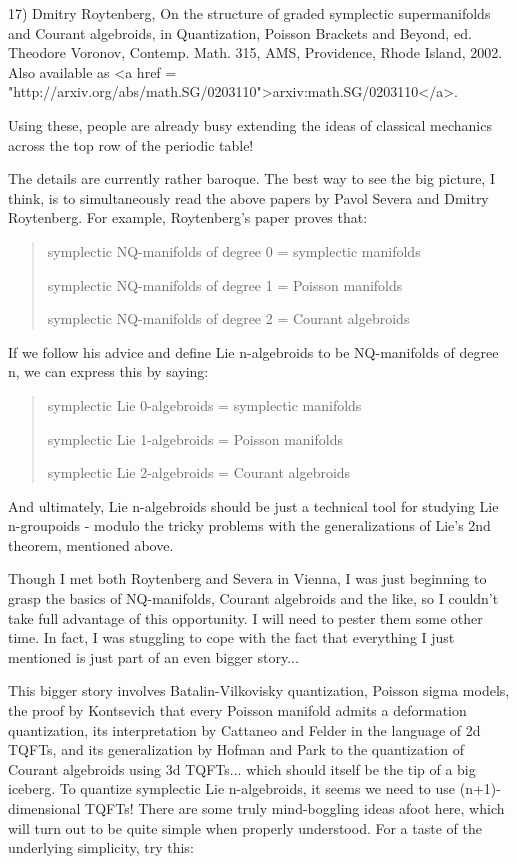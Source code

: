 17) Dmitry Roytenberg, On the structure of graded symplectic 
supermanifolds and Courant algebroids, in Quantization, Poisson 
Brackets and Beyond, ed. Theodore Voronov, Contemp. Math. 315, 
AMS, Providence, Rhode Island, 2002.  Also available as 
<a href = "http://arxiv.org/abs/math.SG/0203110">arxiv:math.SG/0203110</a>.

Using these, people are already busy extending the ideas of
classical mechanics across the top row of the periodic table!

The details are currently rather baroque.  The best way to 
see the big picture, I think, is to simultaneously read the 
above papers by Pavol Severa and Dmitry Roytenberg.  For example,
Roytenberg's paper proves that: 

\begin{quote}
symplectic NQ-manifolds of degree 0 = symplectic manifolds

symplectic NQ-manifolds of degree 1 = Poisson manifolds
 
symplectic NQ-manifolds of degree 2 = Courant algebroids
\end{quote}
    

If we follow his advice and define Lie n-algebroids to be 
NQ-manifolds of degree n, we can express this by saying:

\begin{quote}
symplectic Lie 0-algebroids = symplectic manifolds

symplectic Lie 1-algebroids = Poisson manifolds
 
symplectic Lie 2-algebroids = Courant algebroids
\end{quote}
    

And ultimately, Lie n-algebroids should be just a technical
tool for studying Lie n-groupoids - modulo the tricky problems with
the generalizations of Lie's 2nd theorem, mentioned above.

Though I met both Roytenberg and Severa in Vienna, I was 
just beginning to grasp the basics of NQ-manifolds, Courant 
algebroids and the like, so I couldn't take full advantage of this 
opportunity.  I will need to pester them some other time.  In fact, 
I was stuggling to cope with the fact that everything I just mentioned 
is just part of an even bigger story...

This bigger story involves Batalin-Vilkovisky quantization, 
Poisson sigma models, the proof by Kontsevich that every Poisson 
manifold admits a deformation quantization, its interpretation 
by Cattaneo and Felder in the language of 2d TQFTs, and its 
generalization by Hofman and Park to the quantization of Courant 
algebroids using 3d TQFTs... which should itself be the tip of a big
iceberg.  To quantize symplectic Lie n-algebroids, it seems we
need to use (n+1)-dimensional TQFTs! There are some truly 
mind-boggling ideas afoot here, which will turn out to be quite 
simple when properly understood.  For a taste of the underlying 
simplicity, try this:

